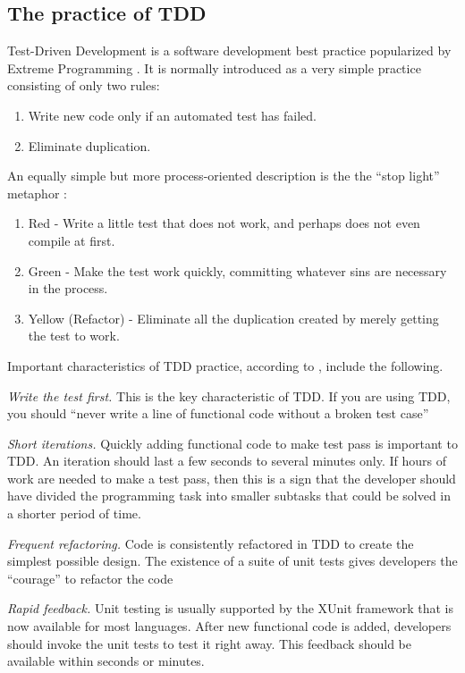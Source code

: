 \documentclass[smallextended]{svjour3}     %
\begin{document}
\subsection{The practice of TDD}

Test-Driven Development \citep{Beck:03} is a software development 
best practice popularized by Extreme Programming \citep{Jeffries:00,Beck:00}. 
It is normally introduced as a very simple practice consisting of only two rules:

\begin{enumerate}
\item Write new code only if an automated test has failed.
\item Eliminate duplication.
\end{enumerate} 

An equally simple but more process-oriented description is the the 
``stop light'' metaphor \citep{Beck:03}: 
\begin{enumerate}
\item Red - Write a little test that does not work, and perhaps does not even compile at first.
\item Green - Make the test work quickly, committing whatever sins are necessary in the process.
\item Yellow (Refactor) - Eliminate all the duplication created by merely getting the test to work.
\end{enumerate}

Important characteristics of TDD practice, according to \citep{Beck:01,Beck:03},  include the following.

{\em Write the test first.}
This is the key characteristic of TDD. If you are using 
TDD, you should ``never write a line of functional 
code without a broken test case''

{\em Short iterations.}
Quickly adding functional code to make test pass is important
to TDD. An iteration should last a few seconds to 
several minutes only. If hours of work are needed to make a 
test pass, then this is a sign that the developer should have divided the programming 
task into smaller subtasks that could be solved in a shorter
period of time.

{\em Frequent refactoring.}
Code is consistently refactored in TDD to create the simplest
possible design. The existence of a suite of unit tests gives 
developers the ``courage'' to refactor the code

{\em Rapid feedback.}
Unit testing is usually supported by the XUnit
framework that is now available for most languages.
After new functional code is added, developers should invoke
the unit tests to test it right away. This feedback should be available
within seconds or minutes. 
\end{document}
